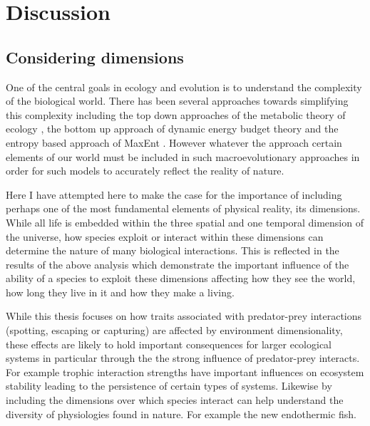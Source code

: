 \chapter{Discussion}
\label{chap:discussion}


\section{Considering dimensions}

One of the central goals in ecology and evolution is to understand the complexity of the biological world. There has been several approaches towards simplifying this complexity including the top down approaches of the metabolic theory of ecology \citep{brown2004}, the bottom up approach of dynamic energy budget theory \citep{kooijman2009dynamic} and the entropy based approach of MaxEnt \citep{harte2008maximum}. However whatever the approach certain elements of our world must be included in such macroevolutionary approaches in order for such models to accurately reflect the reality of nature. 


Here I have attempted here to make the case for the importance of including perhaps one of the most fundamental elements of physical reality, its dimensions. While all life is embedded within the three spatial and one temporal dimension of the universe, how species exploit or interact within these dimensions can determine the nature of many biological interactions. This is reflected in the results of the above analysis which demonstrate the important influence of the ability of a species to exploit these dimensions affecting how they see the world, how long they live in it and how they make a living. 


While this thesis focuses on how traits associated with predator-prey interactions (spotting, escaping or capturing) are affected by environment dimensionality, these effects are likely to hold important consequences for larger ecological systems in particular through the the strong influence of predator-prey interacts. For example trophic interaction strengths have important influences on ecosystem stability leading to the persistence of certain types of systems. Likewise by including the dimensions over which species interact can help understand the diversity of physiologies found in nature. For example the new endothermic fish. 


